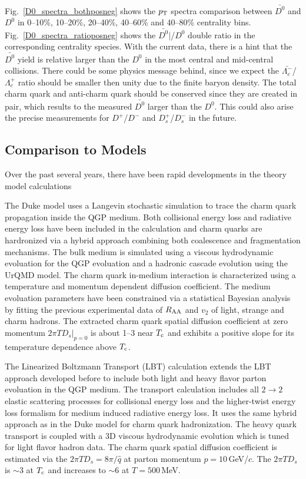 Fig.~\ref{D0_spectra_bothposneg} shows the $p_{\rm T}$ spectra comparison between $\bar{D^{0}}$ and $D^0$ in 0--10\%, 10--20\%, 20--40\%, 40--60\% and 40--80\% centrality bins. Fig.~\ref{D0_spectra_ratioposneg} shows the $\bar{D^{0}}|$/$D^{0}$ double ratio in the corresponding centrality species. With the current data, there is a hint that the $\bar{D^{0}}$ yield is relative larger than the $D^{0}$ in the most central and mid-central collisions. There could be some physics message behind, since we expect the $\bar{\Lambda_{c}^-}$/$\Lambda_{c}^+$ ratio should be smaller then unity due to the finite baryon density. The total charm quark and anti-charm quark should be conserved since they are created in pair, which results to the measured $\bar{D^0}$ larger than the $D^0$. This could also arise the precise measurements for $D^{+}$/$D^{-}$ and $D_{s}^{+}$/$D_{s}^{-}$ in the future.


\subsection{\label{result:theory}Comparison to Models}

Over the past several years, there have been rapid developments in the theory model calculations 

The Duke model uses a Langevin stochastic simulation to trace the charm quark propagation inside the QGP medium. Both collisional energy loss and radiative energy loss have been included in the calculation and charm quarks are hardronized via a hybrid approach combining both coalescence and fragmentation mechanisms. The bulk medium is simulated using a viscous hydrodynamic evoluation for the QGP evoluation and a hadronic cascade evolution using the UrQMD model. The charm quark in-medium interaction is characterized using a temperature and momentum dependent diffusion coefficient. The medium evoluation parameters have been constrained via a statistical Bayesian analysis by fitting the previous experimental data of $R_{\rm AA}$ and $v_{2}$ of light, strange and charm hadrons. The extracted charm quark spatial diffusion coefficient at zero momentum $2\pi TD_s|_{p=0}$ is about 1--3 near $T_{\rm c}$ and exhibits a positive slope for its temperature dependence above $T_{\rm c}$.

The Linearized Boltzmann Transport (LBT) calculation extends the LBT approach developed before to include both light and heavy flavor parton evoluation in the QGP medium. The transport calculation includes all $2\rightarrow 2$ elastic scattering processes for collisional energy loss and the higher-twist energy loss formalism for medium induced radiative energy loss. It uses the same hybrid approach as in the Duke model for charm quark hadronization. The heavy quark transport is coupled with a 3D viscous hydrodynamic evolution which is tuned for light flavor hadron data. The charm quark spatial diffusion coefficient is estimated via the $2\pi TD_s =8\pi/\hat{q}$ at parton momentum $p = 10$\,GeV/$c$. The $2\pi TD_s$ is $\sim$3 at $T_{\rm c}$ and increases to $\sim$6 at $T = 500$\,MeV.

